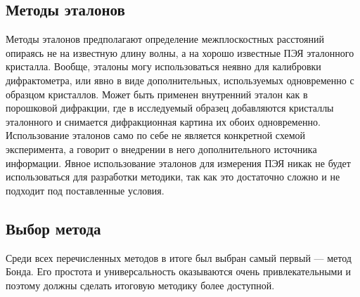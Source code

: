 \subsection{Методы эталонов}

Методы эталонов предполагают определение межплоскостных расстояний опираясь не на известную длину волны, а на хорошо известные ПЭЯ эталонного кристалла.
Вообще, эталоны могу использоваться неявно для калибровки дифрактометра, или явно в виде дополнительных, используемых одновременно с образцом кристаллов.
Может быть применен внутренний эталон как в порошковой дифракции, где в исследуемый образец добавляются кристаллы эталонного и снимается дифракционная картина их обоих одновременно.
Использование эталонов само по себе не является конкретной схемой эксперимента, а говорит о внедрении в него дополнительного источника информации.
Явное использование эталонов для измерения ПЭЯ никак не будет использоваться для разработки методики, так как это достаточно сложно и не подходит под поставленные условия.

\subsection{Выбор метода}

Среди всех перечисленных методов в итоге был выбран самый первый --- метод Бонда.
Его простота и универсальность оказываются очень привлекательными и поэтому должны сделать итоговую методику более доступной.